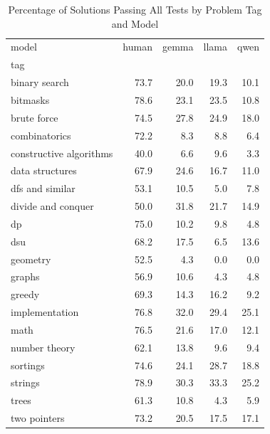 \begin{table}[htbp]
\caption{Percentage of Solutions Passing All Tests by Problem Tag and Model}
\label{tab:pass_rate_tag}
\begin{tabular}{lrrrr}
\toprule
model & human & gemma & llama & qwen \\
tag &  &  &  &  \\
\midrule
binary search & 73.7 & 20.0 & 19.3 & 10.1 \\
bitmasks & 78.6 & 23.1 & 23.5 & 10.8 \\
brute force & 74.5 & 27.8 & 24.9 & 18.0 \\
combinatorics & 72.2 & 8.3 & 8.8 & 6.4 \\
constructive algorithms & 40.0 & 6.6 & 9.6 & 3.3 \\
data structures & 67.9 & 24.6 & 16.7 & 11.0 \\
dfs and similar & 53.1 & 10.5 & 5.0 & 7.8 \\
divide and conquer & 50.0 & 31.8 & 21.7 & 14.9 \\
dp & 75.0 & 10.2 & 9.8 & 4.8 \\
dsu & 68.2 & 17.5 & 6.5 & 13.6 \\
geometry & 52.5 & 4.3 & 0.0 & 0.0 \\
graphs & 56.9 & 10.6 & 4.3 & 4.8 \\
greedy & 69.3 & 14.3 & 16.2 & 9.2 \\
implementation & 76.8 & 32.0 & 29.4 & 25.1 \\
math & 76.5 & 21.6 & 17.0 & 12.1 \\
number theory & 62.1 & 13.8 & 9.6 & 9.4 \\
sortings & 74.6 & 24.1 & 28.7 & 18.8 \\
strings & 78.9 & 30.3 & 33.3 & 25.2 \\
trees & 61.3 & 10.8 & 4.3 & 5.9 \\
two pointers & 73.2 & 20.5 & 17.5 & 17.1 \\
\bottomrule
\end{tabular}
\end{table}

